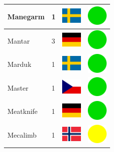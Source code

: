 \documentclass[12pt, a4paper, twoside]{report}
\begin{document}
\begin{center}
\begin{longtable}{|p{5cm}|p{2cm}|p{2cm}|p{2cm}|}
			Manegarm & 1 & \includegraphics[width=1cm]{4x3/se} & \includegraphics[width=1cm]{likes/y} \\ \hline
			Mantar & 3 & \includegraphics[width=1cm]{4x3/de} & \includegraphics[width=1cm]{likes/y} \\ \hline
			Marduk & 1 & \includegraphics[width=1cm]{4x3/se} & \includegraphics[width=1cm]{likes/y} \\ \hline
			Master & 1 & \includegraphics[width=1cm]{4x3/cz} & \includegraphics[width=1cm]{likes/y} \\ \hline
			Meatknife & 1 & \includegraphics[width=1cm]{4x3/de} & \includegraphics[width=1cm]{likes/y} \\ \hline
			Mecalimb & 1 & \includegraphics[width=1cm]{4x3/no} & \includegraphics[width=1cm]{likes/m} \\ \hline

\end{longtable}
\end{center}
\end{document}
